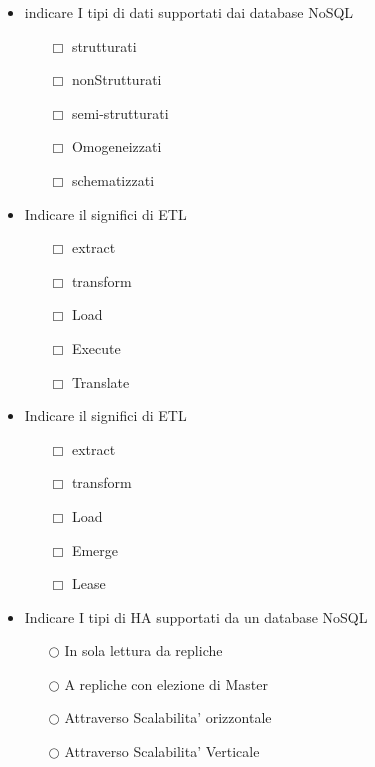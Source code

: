 \documentclass[10pt,twocolumn]{article}
\begin{document}
\begin{itemize}
    \item indicare I tipi di dati supportati dai database NoSQL
          \begin{itemize}
              \item[$\Box$] strutturati
              \item[$\Box$] nonStrutturati
              \item[$\Box$] semi-strutturati
              \item[$\Box$] Omogeneizzati
              \item[$\Box$] schematizzati
          \end{itemize}
\end{itemize}
\begin{itemize}
    \item Indicare il significi di ETL
          \begin{itemize}
              \item[$\Box$] extract
              \item[$\Box$] transform
              \item[$\Box$] Load
              \item[$\Box$] Execute
              \item[$\Box$] Translate
          \end{itemize}
\end{itemize}
\begin{itemize}
    \item Indicare il significi di ETL
          \begin{itemize}
              \item[$\Box$] extract
              \item[$\Box$] transform
              \item[$\Box$] Load
              \item[$\Box$] Emerge
              \item[$\Box$] Lease
          \end{itemize}
\end{itemize}
\begin{itemize}
    \item Indicare I tipi di HA supportati da un database NoSQL
          \begin{itemize}
              \item[$\bigcirc$] In sola lettura da repliche
              \item[$\bigcirc$] A repliche con elezione di Master
              \item[$\bigcirc$] Attraverso Scalabilita' orizzontale
              \item[$\bigcirc$] Attraverso Scalabilita' Verticale
          \end{itemize}
\end{itemize}
\end{document}

